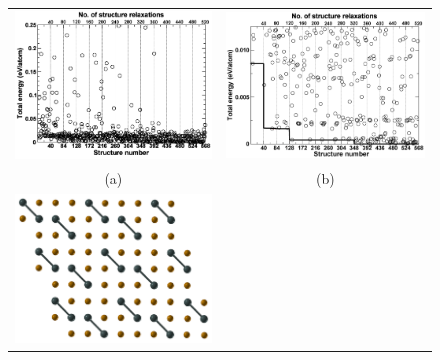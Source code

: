 \documentclass[12pt]{article}
\begin{document}
\begin{figure}[htbp] \centering
	\begin{tabular}{c c}
		\includegraphics[scale=0.2]{pic/testrun_a} &
		\includegraphics[scale=0.2]{pic/testrun_b} \\
		(a) & (b) \\
		\includegraphics[scale=0.25]{pic/testrun_c} &

\end{tabular}
\end{figure}
\end{document}
